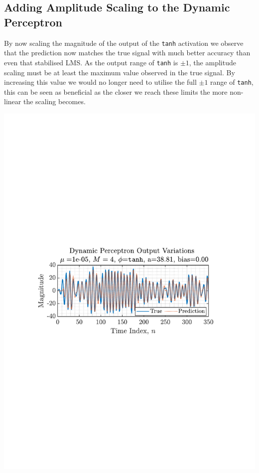 \documentclass[12pt]{article}
\numberwithin{equation}{section}
\begin{document}
	\subsection{Adding Amplitude Scaling to the Dynamic Perceptron} \label{sec: 4-3-amplitude-dynamic-perc}
		\begin{minipage}[b]{0.49\textwidth}
			By now scaling the magnitude of the output of the \texttt{tanh} activation we observe that the prediction now matches the true signal with much better accuracy than even that stabilised LMS. As the output range of \texttt{tanh} is $\pm1$, the amplitude scaling must be at least the maximum value observed in the true signal. By increasing this value we would no longer need to utilise the full $\pm1$ range of \texttt{tanh}, this can be seen as beneficial as the closer we reach these limits the more non-linear the scaling becomes.
		\end{minipage}%
		\begin{minipage}{0.04\textwidth}
			\hspace*{0.04\textwidth}
		\end{minipage}%
		\begin{minipage}[b]{0.49\textwidth}
			\centering
			\includegraphics[trim={2.2cm 11.2cm 3.15cm  11.2cm}, clip, width=\textwidth]{../MATLAB/figures/q4_3_fig01.pdf} 
			\captionsetup{justification=centering}
			\label{fig: 4-3}
		\end{minipage}%
	
\end{document}
